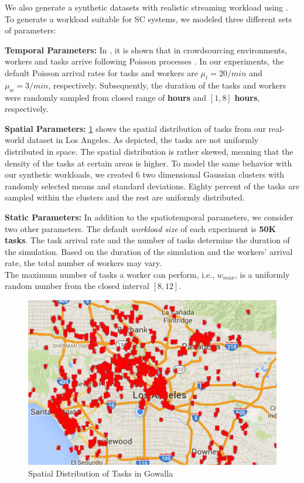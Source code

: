 We also generate a synthetic datasets with realistic streaming workload using \cite{To15}. To generate a workload suitable for SC systems, we modeled three different sets of parameters:

\noindent \textbf{Temporal Parameters:} In \cite{Basu15}, it is shown that in crowdsourcing environments, workers and tasks arrive following Poisson processes \cite{Stoyan87}. In our experiments, the default Poisson arrival rates for tasks and workers are \boldmath$\mu_t = 20/min$ and $\mu_w = 3/min$, respectively. Subsequently, the duration of the tasks and workers were randomly sampled from closed range of \boldmath{$\left[1,4 \right]$} \textbf{hours} and $\left[1,8 \right]$ \textbf{hours}, respectively.

\noindent \textbf{Spatial Parameters:} \cref{fig:la_gowalla} shows the spatial distribution of tasks from our real-world dataset in Los Angeles. As depicted, the tasks are not uniformly distributed in space. The spatial distribution is rather skewed, meaning that the density of the tasks at certain areas is higher. To model the same behavior with our synthetic workloads, we created 6 two dimensional Gaussian clusters with randomly selected means and standard deviations. Eighty percent of the tasks are sampled within the clusters and the rest are uniformly distributed.

\noindent \textbf{Static Parameters:} In addition to the spatiotemporal parameters, we consider two other parameters. The default \emph{workload size} of each experiment is \textbf{50K tasks}. The task arrival rate and the number of tasks determine the duration of the simulation. Based on the duration of the simulation and the workers' arrival rate, the total number of workers may vary.\\
The maximum number of tasks a worker can perform, i.e., $w_{max}$, is a uniformly random number from the closed interval \boldmath$\left[8,12 \right]$.

\begin{figure}[h]
	\centering
	\includegraphics[scale=0.35]{figures/la_flickr.jpg}
	\caption{Spatial Distribution of Tasks in Gowalla}\label{fig:la_gowalla}
\end{figure}

